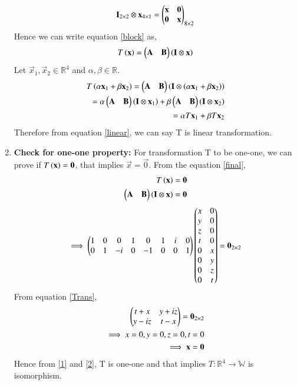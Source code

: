 \documentclass[journal,12pt,twocolumn]{IEEEtran}
\numberwithin{table}{section}
\begin{document}
\begin{enumerate}
\begin{align}
\mathbf{I}_{2\times2}\otimes\mathbf{x}_{4\times1}=\begin{pmatrix}\mathbf{x}&\mathbf{0}\\\mathbf{0}&\mathbf{x}\end{pmatrix}_{8\times2}
\end{align}
Hence we can write equation \eqref{block} as,
\begin{align}
 T\left(\mathbf{x}\right)=\begin{pmatrix}\mathbf{A}&\mathbf{B}\end{pmatrix}\left(\mathbf{I}\otimes\mathbf{x}\right) \label{final}
\end{align}
Let $\vec{x}_1,\vec{x}_2\in\mathbb{R}^4$ and $\alpha,\beta\in\mathbb{R}$.
\begin{align}
T\left(\alpha\mathbf{x}_1+\beta\mathbf{x}_2\right)=\begin{pmatrix}\mathbf{A}&\mathbf{B}\end{pmatrix}\left(\mathbf{I}\otimes\left(\alpha\mathbf{x}_1+\beta\mathbf{x}_2\right)\right)\\
=\alpha\begin{pmatrix}\mathbf{A}&\mathbf{B}\end{pmatrix}\left(\mathbf{I}\otimes\mathbf{x}_1\right)+\beta\begin{pmatrix}\mathbf{A}&\mathbf{B}\end{pmatrix}\left(\mathbf{I}\otimes\mathbf{x}_2\right)\\
=\alpha T\mathbf{x}_1+\beta T\mathbf{x}_2 \label{linear}
\end{align}
Therefore from equation \eqref{linear}, we can say T is linear transformation.
\item \textbf{Check for one-one property: }
For transformation T to be one-one, we can prove if $T\left(\mathbf{x}\right)=\mathbf{0}$, that implies $\vec{x}=\vec{0}$. From the equation \eqref{final},
\begin{align}
T\left(\mathbf{x}\right)=\mathbf{0}\label{1}\\
\begin{pmatrix}\mathbf{A}&\mathbf{B}\end{pmatrix}\left(\mathbf{I}\otimes\mathbf{x}\right)=\mathbf{0}
\end{align}
\begin{align}
\implies \begin{pmatrix}1&0&0&1&0&1&i&0\\0&1&-i&0&-1&0&0&1\end{pmatrix}\begin{pmatrix}x&0\\y&0\\z&0\\t&0\\0&x\\0&y\\0&z\\0&t\end{pmatrix}=\mathbf{0}_{2\times2}
\end{align}
From equation \eqref{Trans},
\begin{align}
\begin{pmatrix}t+x&y+iz\\y-iz&t-x\end{pmatrix}=\mathbf{0}_{2\times2}\\
\implies x=0,y=0,z=0,t=0\\
\implies \mathbf{x}=\mathbf{0}\label{2}
\end{align}
Hence from \eqref{1} and \eqref{2}, T is one-one and that implies $T\colon\mathbb{R}^4\to\mathbb{W}$ is isomorphism.
\end{enumerate}
\end{document}
